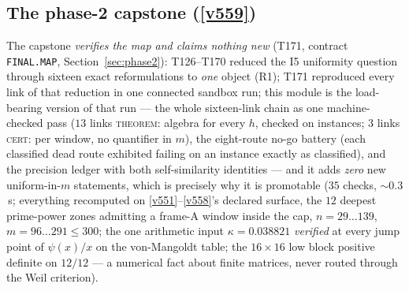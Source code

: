 \documentclass[11pt,a4paper]{article}
\begin{document}
\subsection{The phase-2 capstone (\texorpdfstring{\vref{v559}}{v559})}\label{sec:v559}
The capstone \emph{verifies the map and claims nothing new} (T171, contract
\texttt{FINAL.MAP}, Section~\ref{sec:phase2}): T126--T170 reduced the I5 uniformity
question through sixteen exact reformulations to \emph{one} object (R1); T171 reproduced
every link of that reduction in one connected sandbox run; this module is the
load-bearing version of that run --- the whole sixteen-link chain as one machine-checked
pass ($13$ links \textsc{theorem}: algebra for every $h$, checked on instances; $3$ links
\textsc{cert}: per window, no quantifier in $m$), the eight-route no-go battery (each
classified dead route exhibited failing on an instance exactly as classified), and the
precision ledger with both self-similarity identities --- and it adds \emph{zero} new
uniform-in-$m$ statements, which is precisely why it is promotable
 ($35$ checks, ${\sim}0.3$\,s; everything recomputed on
\vref{v551}--\vref{v558}'s declared surface, the $12$ deepest prime-power zones admitting a
frame-A window inside the cap, $n=29\ldots139$, $m=96\ldots291\le300$; the one arithmetic
input $\kappa=0.038821$ \emph{verified} at every jump point of $\psi(x)/x$ on the
von-Mangoldt table; the $16\times16$ low block positive definite on $12/12$ --- a numerical
fact about finite matrices, never routed through the Weil criterion).
\end{document}
